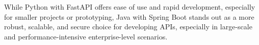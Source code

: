 While Python with FastAPI offers ease of use and rapid development, especially for smaller projects or prototyping, Java with Spring Boot stands out as a more robust, scalable, and secure choice for developing APIs, especially in large-scale and performance-intensive enterprise-level scenarios.





